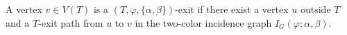 \begin{definition}
A vertex $v\in V(T)$ is a $(T,\varphi,\{\alpha,\beta\})$-exit if there
exist a vertex $u$ outside $T$ and a $T$-exit path from $u$ to $v$ in the
two-color incidence graph $I_G(\varphi;\alpha,\beta)$.
\end{definition}
